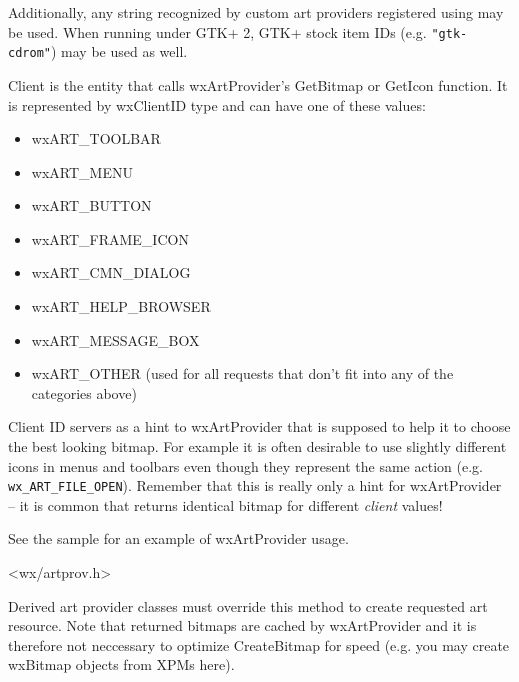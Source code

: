 Additionally, any string recognized by custom art providers registered using
 may be used. When running
under GTK+ 2, GTK+ stock item IDs (e.g. {\tt "gtk-cdrom"}) may be used as well.


Client is the entity that calls wxArtProvider's GetBitmap or GetIcon
function. It is represented by wxClientID type and can have one of these 
values:
\begin{itemize}\itemsep=0pt
\item wxART\_TOOLBAR
\item wxART\_MENU
\item wxART\_BUTTON
\item wxART\_FRAME\_ICON
\item wxART\_CMN\_DIALOG
\item wxART\_HELP\_BROWSER
\item wxART\_MESSAGE\_BOX
\item wxART\_OTHER (used for all requests that don't fit into any of the categories above)
\end{itemize}
Client ID servers as a hint to wxArtProvider that is supposed to help it to
choose the best looking bitmap. For example it is often desirable to use
slightly different icons in menus and toolbars even though they represent the
same action (e.g. {\tt wx\_ART\_FILE\_OPEN}). Remember that this is really
only a hint for wxArtProvider -- it is common that
returns identical bitmap for different {\it client} values!


See the  sample for an example of wxArtProvider usage.




<wx/artprov.h>


\label{wxartprovidercreatebitmap}


Derived art provider classes must override this method to create requested 
art resource. Note that returned bitmaps are cached by wxArtProvider and it is therefore
not neccessary to optimize CreateBitmap for speed (e.g. you may create wxBitmap objects
from XPMs here).

